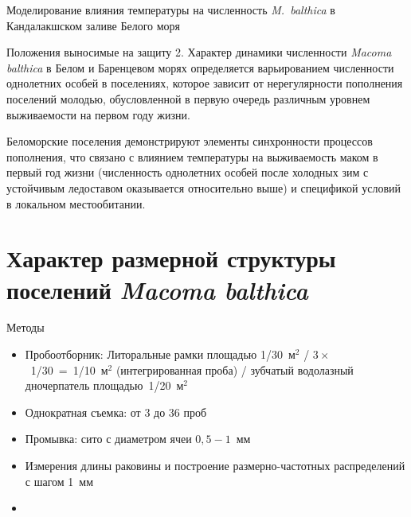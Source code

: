 \documentclass{beamer}
\begin{document}
\begin{frame}{Моделирование влияния температуры на численность {\it M.~balthica} в Кандалакшском заливе Белого моря}
\begin{minipage}[t]{.49\linewidth}
\begin{center}
		\end{center}
	\end{minipage}
\end{frame}

\begin{frame}{Положения выносимые на защиту}
2. Характер динамики численности \textit{Macoma balthica} в Белом и Баренцевом морях определяется варьированием численности однолетних особей в поселениях, которое зависит от нерегулярности пополнения поселений молодью, обусловленной в первую очередь различным уровнем выживаемости на первом году жизни.

\smallskip
Беломорские поселения демонстрируют элементы синхронности процессов пополнения, что связано с влиянием температуры на выживаемость маком в первый год жизни  (численность однолетних особей после холодных зим с устойчивым ледоставом оказывается относительно выше) и спецификой условий в локальном местообитании. 
\end{frame}
		\section[Динамика размерной структуры]{Характер размерной структуры поселений {\it Macoma balthica}}
\begin{frame}{Методы}
	\begin{itemize}
		\item Пробоотборник: Литоральные рамки площадью 1/30~м$^2$ / $3 \times$~1/30~=~1/10~м$^2$ (интегрированная проба) / зубчатый водолазный дночерпатель площадью~1/20~м$^2$
		\item Однократная съемка: от 3 до 36 проб
		\item Промывка: сито с диаметром ячеи $0,5 - 1$~мм 
		\item Измерения длины раковины и построение размерно-частотных распределений с шагом 1~мм
		\item 
	\end{itemize}
\end{frame}
\end{document}
